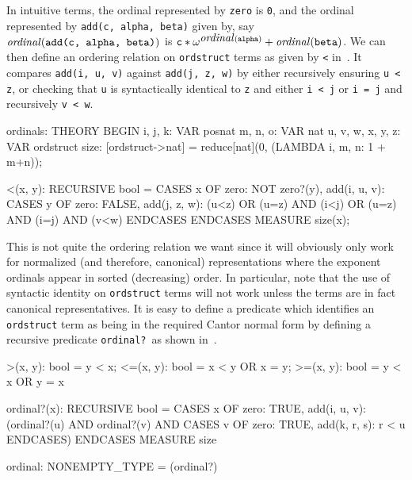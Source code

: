 \documentclass[11pt,twoside]{book}
\newcommand{\pvsref}[1]{\fbox{\footnotesize\ref{#1}}} \def\id#1{\hbox{\textt{#1}}} %
\begin{document}
In intuitive terms, the ordinal represented by \texttt{zero} is
\texttt{0}, and the ordinal represented by \texttt{add(c, alpha, beta)}
given by, say $\mbox{\textit{ordinal}}(\texttt{add(c, alpha, beta)})$ is $
\texttt{c} * \omega^{\mbox{\textit{ordinal}}(\texttt{alpha})} +
\mbox{\textit{ordinal}}(\texttt{beta})$\@.  We can then define an ordering
relation on \texttt{ordstruct} terms as given by \texttt{<}
in~\pvsref{ordlessp}\@.  It compares \texttt{add(i, u, v)} against
\texttt{add(j, z, w)} by either recursively ensuring \texttt{u < z}, or
checking that \texttt{u} is syntactically identical to \texttt{z} and
either \texttt{i < j} or \texttt{i = j} and recursively \texttt{v~<~w}\@.
\begin{session*}\label{ordlessp}
ordinals: THEORY
 BEGIN
  i, j, k: VAR posnat
  m, n, o: VAR nat
  u, v, w, x, y, z: VAR ordstruct
  size: [ordstruct->nat] = reduce[nat](0, (LAMBDA i, m, n: 1 + m+n));

  <(x, y): RECURSIVE bool =
     CASES x OF
        zero: NOT zero?(y),
        add(i, u, v): CASES y OF
                        zero: FALSE,
                        add(j, z, w): (u<z) OR
                                      (u=z) AND (i<j) OR
                                      (u=z) AND (i=j) AND (v<w)
                      ENDCASES
     ENDCASES
   MEASURE size(x);
\end{session*}
This is not quite the ordering relation we want since it will obviously
only work for normalized (and therefore, canonical) representations where
the exponent ordinals appear in sorted (decreasing) order.  In particular,
note that the use of syntactic identity on \texttt{ordstruct} terms will not
work unless the terms are in fact canonical representatives.  It is easy
to define a predicate which identifies an \texttt{ordstruct} term as being
in the required Cantor normal form by defining a recursive predicate
\texttt{ordinal?}\ as shown in~\pvsref{ordinal?}\@.  
\begin{session*}\label{ordinal?}
  >(x, y): bool = y < x;
  <=(x, y): bool = x < y OR x = y;
  >=(x, y): bool = y < x OR y = x

  ordinal?(x): RECURSIVE bool =
    CASES x OF
      zero: TRUE,
      add(i, u, v): (ordinal?(u) AND ordinal?(v) AND 
                      CASES v OF
                        zero: TRUE,
                        add(k, r, s): r < u
                      ENDCASES)
    ENDCASES
   MEASURE size

  ordinal: NONEMPTY_TYPE = (ordinal?)
\end{session*}
\end{document}
